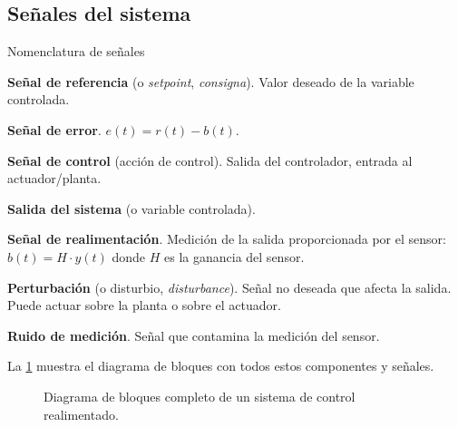 \subsection{Señales del sistema}

\begin{definicion}{Nomenclatura de señales}
  \begin{description}[leftmargin=3.5em, labelwidth=3em]
    \item[$r(t)$] \textbf{Señal de referencia} (o \textit{setpoint}, \textit{consigna}).
      Valor deseado de la variable controlada.
    \item[$e(t)$] \textbf{Señal de error}. $e(t) = r(t) - b(t)$.
    \item[$u(t)$] \textbf{Señal de control} (acción de control). Salida del
      controlador, entrada al actuador/planta.
    \item[$y(t)$] \textbf{Salida del sistema} (o variable controlada).
    \item[$b(t)$] \textbf{Señal de realimentación}. Medición de la salida
      proporcionada por el sensor: $b(t) = H \cdot y(t)$ donde $H$ es la
      ganancia del sensor.
    \item[$d(t)$] \textbf{Perturbación} (o disturbio, \textit{disturbance}).
      Señal no deseada que afecta la salida. Puede actuar sobre la planta
      o sobre el actuador.
    \item[$n(t)$] \textbf{Ruido de medición}. Señal que contamina la
      medición del sensor.
  \end{description}
\end{definicion}

La \cref{fig:componentes-sistema} muestra el diagrama de bloques con todos
estos componentes y señales.

\begin{figure}[htbp]
  \centering
  \caption{Diagrama de bloques completo de un sistema de control realimentado.}
  \label{fig:componentes-sistema}
\end{figure}

